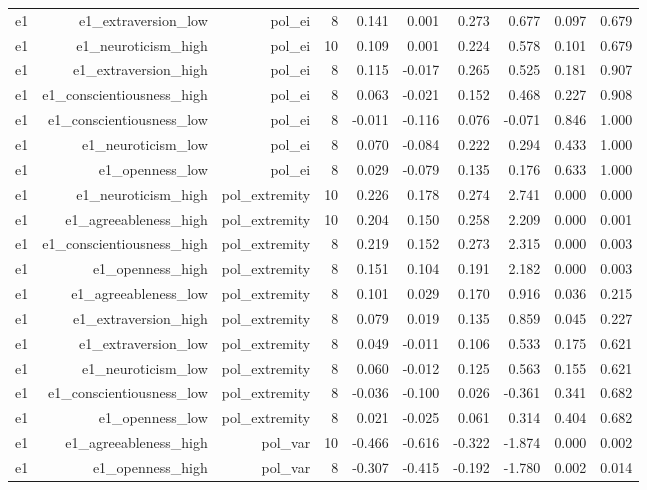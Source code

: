 \documentclass[11pt]{article}
\begin{document}
\begin{landscape}
\begin{longtable}{@{}lrrrrrrrrr@{}}
e1 & e1\_extraversion\_low & pol\_ei & 8 & 0.141 & 0.001 & 0.273 & 0.677 & 0.097 & 0.679 \\
e1 & e1\_neuroticism\_high & pol\_ei & 10 & 0.109 & 0.001 & 0.224 & 0.578 & 0.101 & 0.679 \\
e1 & e1\_extraversion\_high & pol\_ei & 8 & 0.115 & -0.017 & 0.265 & 0.525 & 0.181 & 0.907 \\
e1 & e1\_conscientiousness\_high & pol\_ei & 8 & 0.063 & -0.021 & 0.152 & 0.468 & 0.227 & 0.908 \\
e1 & e1\_conscientiousness\_low & pol\_ei & 8 & -0.011 & -0.116 & 0.076 & -0.071 & 0.846 & 1.000 \\
e1 & e1\_neuroticism\_low & pol\_ei & 8 & 0.070 & -0.084 & 0.222 & 0.294 & 0.433 & 1.000 \\
e1 & e1\_openness\_low & pol\_ei & 8 & 0.029 & -0.079 & 0.135 & 0.176 & 0.633 & 1.000 \\
e1 & e1\_neuroticism\_high & pol\_extremity & 10 & 0.226 & 0.178 & 0.274 & 2.741 & 0.000 & 0.000 \\
e1 & e1\_agreeableness\_high & pol\_extremity & 10 & 0.204 & 0.150 & 0.258 & 2.209 & 0.000 & 0.001 \\
e1 & e1\_conscientiousness\_high & pol\_extremity & 8 & 0.219 & 0.152 & 0.273 & 2.315 & 0.000 & 0.003 \\
e1 & e1\_openness\_high & pol\_extremity & 8 & 0.151 & 0.104 & 0.191 & 2.182 & 0.000 & 0.003 \\
e1 & e1\_agreeableness\_low & pol\_extremity & 8 & 0.101 & 0.029 & 0.170 & 0.916 & 0.036 & 0.215 \\
e1 & e1\_extraversion\_high & pol\_extremity & 8 & 0.079 & 0.019 & 0.135 & 0.859 & 0.045 & 0.227 \\
e1 & e1\_extraversion\_low & pol\_extremity & 8 & 0.049 & -0.011 & 0.106 & 0.533 & 0.175 & 0.621 \\
e1 & e1\_neuroticism\_low & pol\_extremity & 8 & 0.060 & -0.012 & 0.125 & 0.563 & 0.155 & 0.621 \\
e1 & e1\_conscientiousness\_low & pol\_extremity & 8 & -0.036 & -0.100 & 0.026 & -0.361 & 0.341 & 0.682 \\
e1 & e1\_openness\_low & pol\_extremity & 8 & 0.021 & -0.025 & 0.061 & 0.314 & 0.404 & 0.682 \\
e1 & e1\_agreeableness\_high & pol\_var & 10 & -0.466 & -0.616 & -0.322 & -1.874 & 0.000 & 0.002 \\
e1 & e1\_openness\_high & pol\_var & 8 & -0.307 & -0.415 & -0.192 & -1.780 & 0.002 & 0.014 \\

\end{longtable}
\end{landscape}
\end{document}
